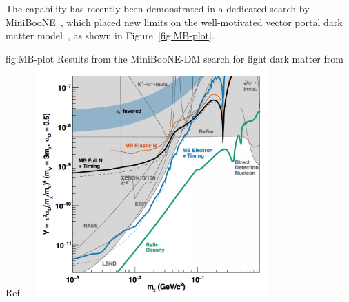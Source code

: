 The capability has recently been demonstrated in a dedicated search by MiniBooNE~\cite{Aguilar-Arevalo:2018wea,Aguilar-Arevalo:2017mqx}, which placed new limits on the well-motivated vector portal dark matter model~\cite{Pospelov:2007mp}, as shown in Figure~\ref{fig:MB-plot}.


\begin{dunefigure}{fig:MB-plot}
{Results from the MiniBooNE-DM search for light dark matter from Ref.~\cite{Aguilar-Arevalo:2018wea}
}
\includegraphics[width=0.7\textwidth,height=3.5in]{graphics/MB-plot.png}
\end{dunefigure}

